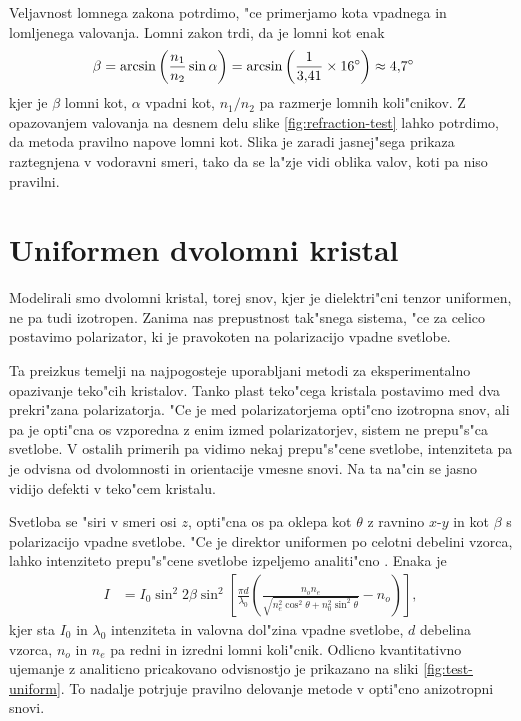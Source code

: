 \documentclass[12pt,twoside,openright,final]{report}
\begin{document}
Veljavnost lomnega zakona potrdimo, "ce primerjamo kota vpadnega in lomljenega valovanja. 
Lomni zakon trdi, da je lomni kot enak
\begin{align}
 \beta &= \arcsin \left(\frac{n_1}{n_2} \sin \alpha \right) = \arcsin \left( \frac{1}{3,\!41} \times 16\degree \right) \approx 4,\!7\degree
\end{align}
kjer je $\beta$ lomni kot, $\alpha$ vpadni kot, $n_1/n_2$ pa razmerje lomnih koli"cnikov. 
Z opazovanjem valovanja na desnem delu slike \ref{fig:refraction-test} lahko potrdimo, da metoda pravilno napove lomni kot. 
Slika je zaradi jasnej"sega prikaza raztegnjena v vodoravni smeri, tako da se la"zje vidi oblika valov, koti pa niso pravilni. 

\section{Uniformen dvolomni kristal}
Modelirali smo dvolomni kristal, torej snov, kjer je dielektri"cni tenzor uniformen, ne pa tudi izotropen. 
Zanima nas prepustnost tak"snega sistema, "ce za celico postavimo polarizator, ki je pravokoten na polarizacijo vpadne svetlobe. 

Ta preizkus temelji na najpogosteje uporabljani metodi za eksperimentalno opazivanje teko"cih kristalov. 
Tanko plast teko"cega kristala postavimo med dva prekri"zana polarizatorja. 
"Ce je med polarizatorjema opti"cno izotropna snov, ali pa je opti"cna os vzporedna z enim izmed polarizatorjev, sistem ne prepu"s"ca svetlobe. 
V ostalih primerih pa vidimo nekaj prepu"s"cene svetlobe, intenziteta pa je odvisna od dvolomnosti in orientacije vmesne snovi. 
Na ta na"cin se jasno vidijo defekti v teko"cem kristalu. 

Svetloba se "siri v smeri osi $z$, opti"cna os pa oklepa kot $\theta$ z ravnino $x$-$y$ in kot $\beta$ s polarizacijo vpadne svetlobe. 
"Ce je direktor uniformen po celotni debelini vzorca, lahko intenziteto prepu"s"cene svetlobe izpeljemo analiti"cno \cite{kleman}. 
Enaka je
\begin{align}
 I &= I_0 \sin^2 2\beta \sin^2 \left[ \frac{\pi d}{\lambda_0} \left( \frac{n_o n_e}{\sqrt{n_e^2 \cos^2 \theta + n_0^2 \sin^2 \theta}} - n_o \right)\right],
\end{align}
kjer sta $I_0$ in $\lambda_0$ intenziteta in valovna dol"zina vpadne svetlobe, $d$ debelina vzorca, $n_o$ in $n_e$ pa redni in izredni lomni koli"cnik. 
Odlicno kvantitativno ujemanje z analiticno pricakovano odvisnostjo je prikazano na sliki \ref{fig:test-uniform}.
To nadalje potrjuje pravilno delovanje metode v opti"cno anizotropni snovi. 
\end{document}

